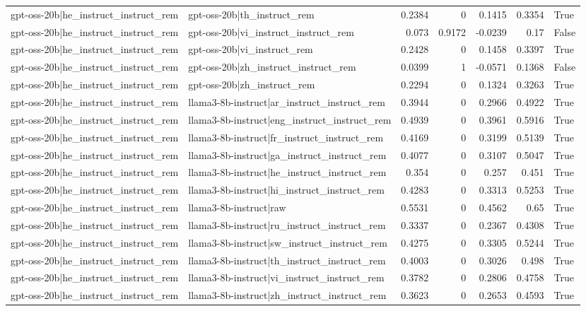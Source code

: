 \begin{table}
\begin{tabular}{l l r r r r l}
gpt-oss-20b|he_instruct_instruct_rem & gpt-oss-20b|th_instruct_rem & 0.2384 & 0 & 0.1415 & 0.3354 & True \\
gpt-oss-20b|he_instruct_instruct_rem & gpt-oss-20b|vi_instruct_instruct_rem & 0.073 & 0.9172 & -0.0239 & 0.17 & False \\
gpt-oss-20b|he_instruct_instruct_rem & gpt-oss-20b|vi_instruct_rem & 0.2428 & 0 & 0.1458 & 0.3397 & True \\
gpt-oss-20b|he_instruct_instruct_rem & gpt-oss-20b|zh_instruct_instruct_rem & 0.0399 & 1 & -0.0571 & 0.1368 & False \\
gpt-oss-20b|he_instruct_instruct_rem & gpt-oss-20b|zh_instruct_rem & 0.2294 & 0 & 0.1324 & 0.3263 & True \\
gpt-oss-20b|he_instruct_instruct_rem & llama3-8b-instruct|ar_instruct_instruct_rem & 0.3944 & 0 & 0.2966 & 0.4922 & True \\
gpt-oss-20b|he_instruct_instruct_rem & llama3-8b-instruct|eng_instruct_instruct_rem & 0.4939 & 0 & 0.3961 & 0.5916 & True \\
gpt-oss-20b|he_instruct_instruct_rem & llama3-8b-instruct|fr_instruct_instruct_rem & 0.4169 & 0 & 0.3199 & 0.5139 & True \\
gpt-oss-20b|he_instruct_instruct_rem & llama3-8b-instruct|ga_instruct_instruct_rem & 0.4077 & 0 & 0.3107 & 0.5047 & True \\
gpt-oss-20b|he_instruct_instruct_rem & llama3-8b-instruct|he_instruct_instruct_rem & 0.354 & 0 & 0.257 & 0.451 & True \\
gpt-oss-20b|he_instruct_instruct_rem & llama3-8b-instruct|hi_instruct_instruct_rem & 0.4283 & 0 & 0.3313 & 0.5253 & True \\
gpt-oss-20b|he_instruct_instruct_rem & llama3-8b-instruct|raw & 0.5531 & 0 & 0.4562 & 0.65 & True \\
gpt-oss-20b|he_instruct_instruct_rem & llama3-8b-instruct|ru_instruct_instruct_rem & 0.3337 & 0 & 0.2367 & 0.4308 & True \\
gpt-oss-20b|he_instruct_instruct_rem & llama3-8b-instruct|sw_instruct_instruct_rem & 0.4275 & 0 & 0.3305 & 0.5244 & True \\
gpt-oss-20b|he_instruct_instruct_rem & llama3-8b-instruct|th_instruct_instruct_rem & 0.4003 & 0 & 0.3026 & 0.498 & True \\
gpt-oss-20b|he_instruct_instruct_rem & llama3-8b-instruct|vi_instruct_instruct_rem & 0.3782 & 0 & 0.2806 & 0.4758 & True \\
gpt-oss-20b|he_instruct_instruct_rem & llama3-8b-instruct|zh_instruct_instruct_rem & 0.3623 & 0 & 0.2653 & 0.4593 & True \\

\end{tabular}
\end{table}
